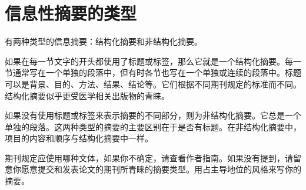 \documentclass[a4paper]{ctexbook}
\begin{document}
\section{信息性摘要的类型}

有两种类型的信息摘要：结构化摘要和非结构化摘要。

如果在每一节文字的开头都使用了标题或标签，那么它就是一个结构化摘要。每一节通常写在一个单独的段落中，但有时各节也写在一个单独或连续的段落中。标题可以是背景、目的、方法、结果、结论等。它们根据不同期刊规定的标准而不同。结构化摘要似乎更受医学相关出版物的青睐。

如果没有使用标题或标签来表示摘要的不同部分，则为非结构化摘要。它总是一个单独的段落。这两种类型的摘要的主要区别在于是否有标题。在非结构化摘要中，项目的内容和顺序与结构化摘要中一样。

期刊规定应使用哪种文体，如果你不确定，请查看作者指南。如果没有提到，请留意你愿意提交和发表论文的期刊所青睐的摘要类型。用占主导地位的风格来写你的摘要。
\end{document}
